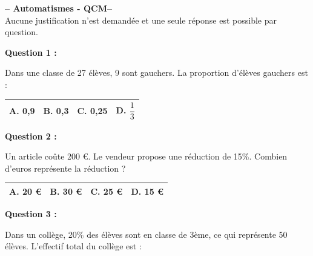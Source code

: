 \documentclass[12pt,a4paper]{article}
\begin{document}
\begin{center}
    \Large \textbf{-- Automatismes - QCM--} \\[5pt]
    \normalsize Aucune justification n’est demandée et une seule réponse est possible par question.
\end{center}

\vspace{0.7cm}

\textbf{Question 1 :}
\vspace{5pt}

Dans une classe de 27 élèves, 9 sont gauchers. La proportion d’élèves gauchers est :
\vspace{0.3cm}

\renewcommand{\arraystretch}{3}
\begin{tabular}{|m{3.4cm}|m{3.4cm}|m{3.4cm}|m{3.4cm}|}
\hline
\centering \vspace{-0.3cm} \textbf{A.} 0,9 & 
\centering \vspace{-0.3cm} \textbf{B.} 0,3 & 
\centering \vspace{-0.3cm} \textbf{C.} 0,25 & 
\centering \vspace{-0.3cm} \textbf{D.} $\dfrac{1}{3}$ \tabularnewline
\hline
\end{tabular}

\vspace{0.7cm}

\textbf{Question 2 :}
\vspace{5pt}

Un article coûte 200 €. Le vendeur propose une réduction de 15\%. Combien d'euros représente la réduction ?
\vspace{0.3cm}

\renewcommand{\arraystretch}{3}
\begin{tabular}{|m{3.4cm}|m{3.4cm}|m{3.4cm}|m{3.4cm}|}
\hline
\centering \vspace{-0.3cm} \textbf{A.} 20 € & 
\centering \vspace{-0.3cm} \textbf{B.} 30 € & 
\centering \vspace{-0.3cm} \textbf{C.} 25 € & 
\centering \vspace{-0.3cm} \textbf{D.} 15 € \tabularnewline
\hline
\end{tabular}

\vspace{0.7cm}

\textbf{Question 3 :}
\vspace{5pt}

Dans un collège, 20\% des élèves sont en classe de 3ème, ce qui représente 50 élèves. L’effectif total du collège est :
\vspace{0.3cm}
\end{document}
